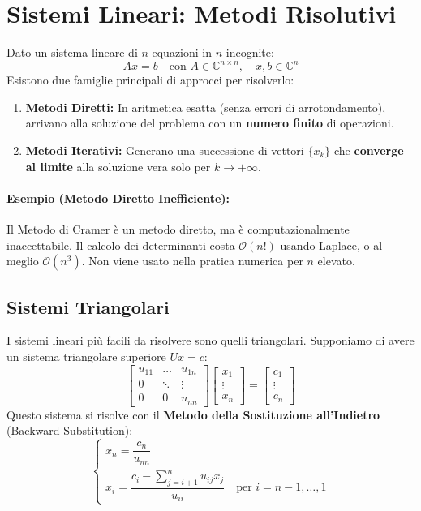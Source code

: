 \documentclass[a4paper,12pt]{article}
\begin{document}
	\section{Sistemi Lineari: Metodi Risolutivi}
	
	Dato un sistema lineare di $n$ equazioni in $n$ incognite:
	\begin{equation}
		Ax = b \quad \text{con } A \in \mathbb{C}^{n \times n}, \quad x, b \in \mathbb{C}^n
	\end{equation}
	Esistono due famiglie principali di approcci per risolverlo:
	\begin{enumerate}
		\item \textbf{Metodi Diretti:} In aritmetica esatta (senza errori di arrotondamento), arrivano alla soluzione del problema con un \textbf{numero finito} di operazioni.
		\item \textbf{Metodi Iterativi:} Generano una successione di vettori $\{x_k\}$ che \textbf{converge al limite} alla soluzione vera solo per $k \to +\infty$.
	\end{enumerate}
	
	\paragraph{Esempio (Metodo Diretto Inefficiente):}
	Il Metodo di Cramer è un metodo diretto, ma è computazionalmente inaccettabile. Il calcolo dei determinanti costa $\mathcal{O}(n!)$ usando Laplace, o al meglio $\mathcal{O}(n^3)$. Non viene usato nella pratica numerica per $n$ elevato.
	
	\subsection{Sistemi Triangolari}
	I sistemi lineari più facili da risolvere sono quelli triangolari. Supponiamo di avere un sistema triangolare superiore $Ux = c$:
	\[
	\begin{bmatrix}
		u_{11} & \dots & u_{1n} \\
		0 & \ddots & \vdots \\
		0 & 0 & u_{nn}
	\end{bmatrix}
	\begin{bmatrix} x_1 \\ \vdots \\ x_n \end{bmatrix} = \begin{bmatrix} c_1 \\ \vdots \\ c_n \end{bmatrix}
	\]
	Questo sistema si risolve con il \textbf{Metodo della Sostituzione all'Indietro} (Backward Substitution):
	\begin{equation}
		\begin{cases}
			x_n = \dfrac{c_n}{u_{nn}} \\
			x_i = \dfrac{c_i - \sum_{j=i+1}^{n} u_{ij} x_j}{u_{ii}} \quad \text{per } i = n-1, \dots, 1
		\end{cases}
	\end{equation}
	
\end{document}
